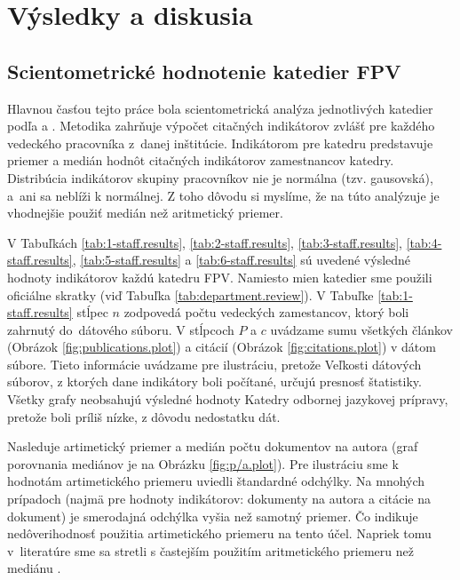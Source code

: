 \chapter{Výsledky a diskusia}

\section{Scientometrické hodnotenie katedier FPV}

Hlavnou časťou tejto práce bola scientometrická analýza jednotlivých katedier
podľa \citet{Kazakis2014a} a \citet{Kazakis2014b,Kazakis2015}. Metodika zahrňuje
výpočet citačných indikátorov zvlášť pre každého vedeckého pracovníka
z~danej inštitúcie. Indikátorom pre katedru predstavuje priemer a medián
hodnôt citačných indikátorov zamestnancov katedry.
Distribúcia indikátorov skupiny pracovníkov nie je normálna (tzv. gausovská),
a~ani sa neblíži k normálnej. Z toho dôvodu si myslíme, že na túto analýzuje je
vhodnejšie použiť medián než aritmetický priemer.

V Tabuľkách  \ref{tab:1-staff.results}, \ref{tab:2-staff.results},
\ref{tab:3-staff.results}, \ref{tab:4-staff.results}, \ref{tab:5-staff.results}
a \ref{tab:6-staff.results} sú uvedené výsledné hodnoty indikátorov každú
katedru FPV.  Namiesto mien katedier sme použili oficiálne skratky (viď Tabuľka
\ref{tab:department.review}).  V Tabuľke  \ref{tab:1-staff.results} stĺpec $n$
zodpovedá počtu vedeckých zamestancov, ktorý boli zahrnutý do~dátového súboru.
V stĺpcoch $P$ a $c$ uvádzame sumu všetkých článkov (Obrázok
\ref{fig:publications.plot}) a citácií (Obrázok \ref{fig:citations.plot})
v dátom súbore.  Tieto informácie uvádzame pre ilustráciu, pretože Veľkosti
dátových súborov, z ktorých dane indikátory boli počítané, určujú presnosť
štatistiky. Všetky grafy neobsahujú výsledné hodnoty Katedry odbornej
jazykovej prípravy, pretože boli príliš nízke, z dôvodu nedostatku dát.


Nasleduje artimetický priemer a medián počtu dokumentov na autora (graf
porovnania mediánov je na Obrázku \ref{fig:p/a.plot}).  Pre ilustráciu sme k
hodnotám artimetického priemeru uviedli štandardné odchýlky.  Na mnohých
prípadoch (najmä pre hodnoty indikátorov: dokumenty na autora a citácie na dokument)
je smerodajná odchýlka vyšia než samotný priemer. Čo indikuje nedôverihodnosť
použitia artimetického priemeru na tento účel. Napriek tomu v~literatúre sme sa
stretli s častejším použitím aritmetického priemeru než mediánu
\citep{Lazaridis2010}.

